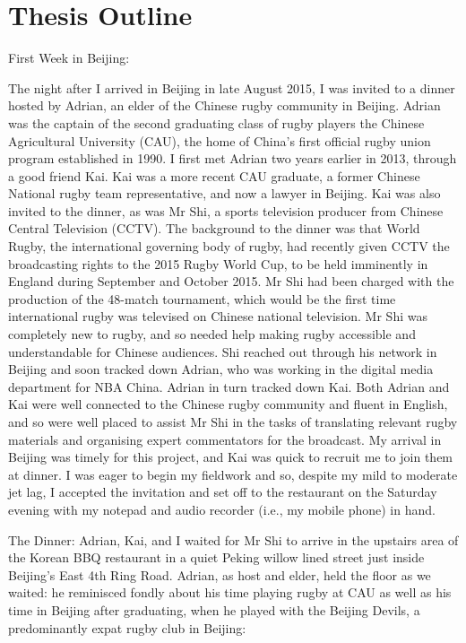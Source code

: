 \chapter{\label{introduction}Thesis Outline}


First Week in Beijing:

The night after I arrived in Beijing in late August 2015, I was invited to a dinner hosted by Adrian, an elder of the Chinese rugby community in Beijing.  Adrian was the captain of the second graduating class of rugby players the Chinese Agricultural University (CAU), the home of China's first official rugby union program established in 1990.  I first met Adrian two years earlier in 2013, through a good friend Kai. Kai was  a more recent CAU graduate, a former Chinese National rugby team representative, and now a lawyer in Beijing.  Kai was also invited to the dinner, as was Mr Shi, a sports television producer from Chinese Central Television (CCTV).  The background to the dinner was that World Rugby, the international governing body of rugby, had recently given CCTV the broadcasting rights to the 2015 Rugby World Cup, to be held imminently in England during September and October 2015.  Mr Shi had been charged with the production of the 48-match tournament, which would be the first time international rugby was televised on Chinese national television.  Mr Shi was completely new to rugby, and so needed help making rugby accessible and understandable for Chinese audiences.  Shi reached out through his network in Beijing and soon tracked down Adrian, who was working in the digital media department for NBA China. Adrian in turn tracked down Kai. Both Adrian and Kai were well connected to the Chinese rugby community and fluent in English, and so were well placed to assist Mr Shi in the tasks of translating relevant rugby materials and organising expert commentators for the broadcast.  My arrival in Beijing was timely for this project, and Kai was quick to recruit me to join them at dinner.  I was eager to begin my fieldwork and so, despite my mild to moderate jet lag, I accepted the invitation and set off to the restaurant on the Saturday evening with my notepad and audio recorder (i.e., my mobile phone) in hand.

The Dinner:
Adrian, Kai, and I waited for Mr Shi to arrive in the upstairs area of the Korean BBQ restaurant in a quiet Peking willow lined street just inside Beijing's East 4th Ring Road.  Adrian, as host and elder, held the floor as we waited: he reminisced fondly about his time playing rugby at CAU as well as his time in Beijing after graduating, when he played with the Beijing Devils, a predominantly expat rugby club in Beijing:

